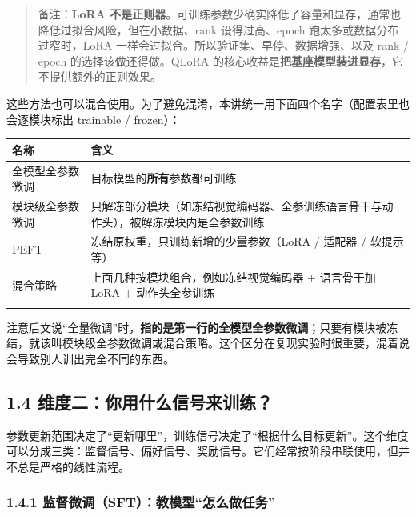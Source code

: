 \documentclass[
  chinese,
]{ctexart}
\begin{document}
\begin{quote}
备注：\textbf{LoRA
不是正则器}。可训练参数少确实降低了容量和显存，通常也降低过拟合风险，但在小数据、rank
设得过高、epoch 跑太多或数据分布过窄时，LoRA
一样会过拟合。所以验证集、早停、数据增强、以及 rank / epoch
的选择该做还得做。QLoRA
的核心收益是\textbf{把基座模型装进显存}，它不提供额外的正则效果。
\end{quote}

这些方法也可以混合使用。为了避免混淆，本讲统一用下面四个名字（配置表里也会逐模块标出
trainable / frozen）：

\begin{center}
\begin{tabular}{@{}>{\raggedright\arraybackslash}p{} >{\raggedright\arraybackslash}p{}@{}}
\toprule\noalign{}
名称 & 含义 \\
\midrule\noalign{}
全模型全参数微调 & 目标模型的\textbf{所有}参数都可训练 \\
模块级全参数微调 & 只解冻部分模块（如冻结视觉编码器、全参训练语言骨干与动作头），被解冻模块内是全参数训练 \\
PEFT & 冻结原权重，只训练新增的少量参数（LoRA / 适配器 / 软提示等） \\
混合策略 & 上面几种按模块组合，例如冻结视觉编码器 + 语言骨干加 LoRA + 动作头全参训练 \\
\bottomrule\noalign{}
\end{tabular}
\end{center}

注意后文说``全量微调''时，\textbf{指的是第一行的全模型全参数微调}；只要有模块被冻结，就该叫模块级全参数微调或混合策略。这个区分在复现实验时很重要，混着说会导致别人训出完全不同的东西。

\subsection{1.4
维度二：你用什么信号来训练？}\label{ux7ef4ux5ea6ux4e8cux4f60ux7528ux4ec0ux4e48ux4fe1ux53f7ux6765ux8badux7ec3}

参数更新范围决定了``更新哪里''，训练信号决定了``根据什么目标更新''。这个维度可以分成三类：监督信号、偏好信号、奖励信号。它们经常按阶段串联使用，但并不总是严格的线性流程。

\subsubsection{1.4.1
监督微调（SFT）：教模型``怎么做任务''}\label{ux76d1ux7763ux5faeux8c03sftux6559ux6a21ux578bux600eux4e48ux505aux4efbux52a1}
\end{document}

